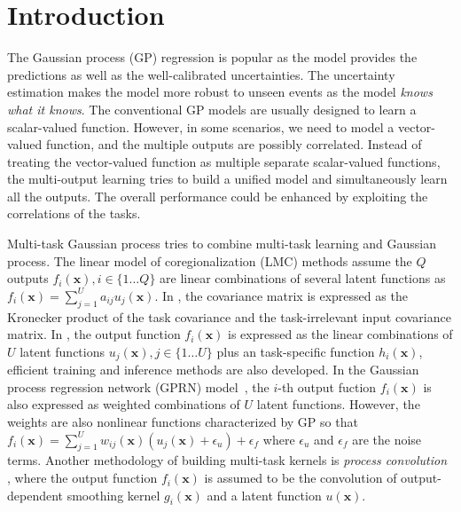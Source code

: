 \section{Introduction}

The Gaussian process (GP) regression is popular as the model provides the predictions as well as the well-calibrated uncertainties. The uncertainty estimation makes the model more robust to unseen events as the model \emph{knows what it knows}. The conventional GP models are usually designed to learn a scalar-valued function. However, in some scenarios, we need to model a vector-valued function, and the multiple outputs are possibly correlated. Instead of treating the vector-valued function as multiple separate scalar-valued functions, the multi-output learning \cite{zhang2017survey} tries to build a unified model and simultaneously learn all the outputs. The overall performance could be enhanced by exploiting the correlations of the tasks.

Multi-task Gaussian process \cite{vectorvaluedkernel} tries to combine multi-task learning and Gaussian process. The linear model of coregionalization (LMC) methods \cite{journel1978mining} assume the $Q$ outputs $f_i(\bm{x}), i \in \{1\dots Q\}$ are linear combinations of several latent functions as $f_i(\bm{x}) = \sum_{j=1}^U a_{ij} u_j(\bm{x})$. In \cite{bonilla2008multi}, the covariance matrix is expressed as the Kronecker product of the task covariance and the task-irrelevant input covariance matrix. In \cite{nguyen2014collaborative}, the output function $f_i(\bm{x})$ is expressed as the linear combinations of $U$ latent functions $u_j(\bm{x}), j \in \{1\dots U\}$ plus an task-specific function $h_i(\bm{x})$, efficient training and inference methods are also developed. In the Gaussian process regression network (GPRN) model~\cite{wilson2012gaussian}, the $i$-th output fuction $f_i(\bm{x})$ is also expressed as weighted combinations of $U$ latent functions. However, the weights are also nonlinear functions characterized by GP so that $f_i(\bm{x}) = \sum_{j=1}^U w_{ij}(\bm{x}) (u_j(\bm{x}) + \epsilon_u) + \epsilon_f$ where $\epsilon_u$ and $\epsilon_f$ are the noise terms. Another methodology of building multi-task kernels is \emph{process convolution} \cite{boyle2005dependent,alvarez2009sparse,alvarez2011computationally}, where the output function $f_i(\bm{x})$ is assumed to be the convolution of output-dependent smoothing kernel $g_i(\bm{x})$ and a latent function $u(\bm{x})$.

